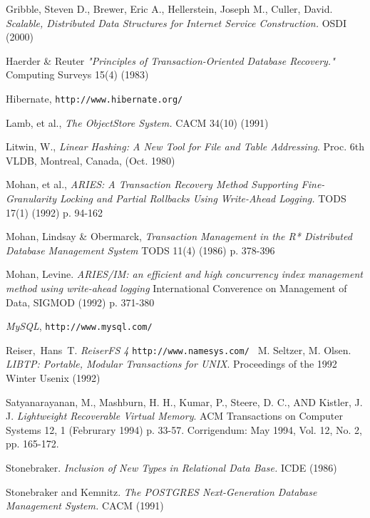 \documentclass[10pt,letterpaper,twocolumn,english]{article}
\begin{document}
\begin{thebibliography}{99}
\begin{small}
  Gribble, Steven D., Brewer, Eric A., Hellerstein, Joseph M., Culler, David.  {\em Scalable, Distributed Data Structures for Internet Service Construction. } OSDI (2000)

 Haerder \& Reuter {\em "Principles of Transaction-Oriented Database Recovery." } Computing Surveys 15(4) (1983) %

 Hibernate, {\tt http://www.hibernate.org/}

 Lamb, et al., {\em The ObjectStore System.} CACM 34(10) (1991)


 Litwin, W., {\em Linear Hashing: A New Tool for File and Table Addressing}. Proc. 6th VLDB, Montreal, Canada, (Oct. 1980) %

 Mohan, et al., {\em ARIES: A Transaction Recovery Method Supporting Fine-Granularity Locking and Partial Rollbacks Using Write-Ahead Logging.} TODS 17(1) (1992) p. 94-162

 Mohan, Lindsay \& Obermarck, {\em Transaction Management in the R* Distributed Database Management System} TODS 11(4) (1986) p. 378-396

 Mohan, Levine. {\em ARIES/IM: an efficient and high concurrency index management method using write-ahead logging} International Converence on Management of Data, SIGMOD (1992) p. 371-380

 {\em MySQL}, {\tt http://www.mysql.com/ }

 Reiser,~Hans~T. {\em ReiserFS 4} {\tt http://www.namesys.com/ }
%
 M. Seltzer, M. Olsen. {\em LIBTP: Portable, Modular Transactions for UNIX}. Proceedings of the 1992 Winter Usenix (1992)

 Satyanarayanan, M., Mashburn, H. H., Kumar, P., Steere, D. C., AND Kistler, J. J. {\em Lightweight Recoverable Virtual Memory}. ACM Transactions on Computer Systems 12, 1 (Februrary 1994) p. 33-57. Corrigendum: May 1994, Vol. 12, No. 2, pp. 165-172.

 Stonebraker. {\em Inclusion of New Types in Relational Data Base. } ICDE (1986) %

 Stonebraker and Kemnitz. {\em The POSTGRES Next-Generation Database Management System. } CACM (1991)


\end{small}
\end{thebibliography}
\end{document}
